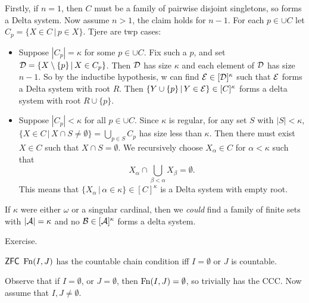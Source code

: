 \documentclass{article}
\begin{document}
Firstly, if $n=1$, then $C$ must be a family of pairwise disjoint singletons, so forms a Delta system. Now assume $n>1$, the claim holds for $n-1$. For each $p \in \cup C$ let $C_{p} = \{X \in C \, | \, p \in X\}$. Tjere are twp cases: \begin{itemize}
    \item Suppose $|C_{p}| =  \kappa$ for some $p \in \cup C$. Fix such a $p$, and set $\mathcal{D} = \{ X \setminus \{p\} \, | \, X \in C_{p}\}$. Then $\mathcal{D}$ has size $\kappa$ and each element of $\mathcal{D}$ has size $n-1$. So by the inductibe hypothesis, w can find $\mathcal{E} \in [\mathcal{D}]^{\kappa}$ such that $\mathcal{E}$ forms a Delta system with root $R$. Then $\{ Y \cup \{p\} \, | \, Y \in \mathcal{E}\} \in [C]^{\kappa}$ forms a delta system with root $R \cup \{p\}$.
    \item Suppose $|C_{p}|< \kappa$ for all $p \in \cup C$. Since $\kappa$ is regular, for any set $S$ with $|S|<\kappa$, $\{X \in C \, | \, X \cap S \neq \emptyset \} = \bigcup_{p \in S} C_{p}$ has size less than $\kappa$.\gap
          Then there must exist $X \in C$ such that $X \cap S = \emptyset$. We recursively choose $X_{\alpha} \in C$ for $\alpha < \kappa$ such that \[X_{\alpha} \cap \bigcup_{\beta < \alpha} X_{\beta} = \emptyset.\] This means that $\{X_{\alpha} \, | \, \alpha \in \kappa\} \in [C]^{\kappa}$ is a Delta system with empty root.
\end{itemize}
\endproof
\begin{fancyprop}{}
    If $\kappa$ were either $\omega$ or a singular cardinal, then we \textit{could} find a family of finite sets with $|\mathcal{A}| = \kappa$ and no $\mathcal{B} \in [\mathcal{A}]^{\kappa}$ forms a delta system.
\end{fancyprop}
\proof Exercise. \endproof
\begin{fancylem}{$\mathsf{ZFC}$}
    $\operatorname{Fn}(I,J)$ has the countable chain condition iff $I = \emptyset$ or $J$ is countable.
\end{fancylem}
\proof Observe that if $I = \emptyset$, or $J= \emptyset$, then $\operatorname{Fn}(I,J)=\emptyset$, so trivially has the CCC.\gap
Now assume that $I,J \neq \emptyset$.
\end{document}
